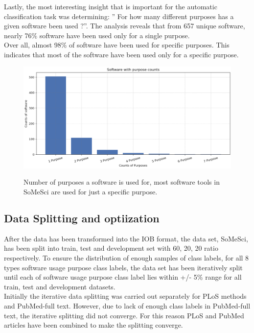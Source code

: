 Lastly, the most interesting insight that is important for the automatic classification task was determining: ” For how many different purposes has a given software been used ?”.  The analysis reveals that from 657 unique software, nearly 76\% software have been used only for a single purpose. \\

Over all, almost 98\% of software have been used for specific purposes. This indicates that most of the software have been used only for a specific purpose.  


\begin{figure}[h]
	\centering
	\includegraphics[width=.75\linewidth]{4.graphics/figures/ch_4/analysisresults/7.counts of software purpose}
	\label{fig:chapter03:subfloat:grafik1}
	\caption{Number of purposes a software is used for, most software tools in SoMeSci are used for just a specific purpose.}
\end{figure}


\subsection{Data Splitting and optiization}
\label{subsec:dataset:preprocessing:Splitting}
After the data has been transformed into the IOB format, the data set, \ac{SoMeSci}, has been split into train, test and development set with  60, 20, 20 ratio respectively. To ensure the distribution  of enough samples of class labels, for all 8 types software usage purpose class labels, the data set has been iteratively split until each of software usage purpose class label lies within +/- 5\%  range for all train, test and development datasets. \\ 

Initially the iterative data splitting was carried out separately for PLoS methods and PubMed-full text. However, due to lack of enough class labels in PubMed-full text, the iterative splitting did not converge. For this reason PLoS and PubMed articles have been combined to make the splitting converge. \\

